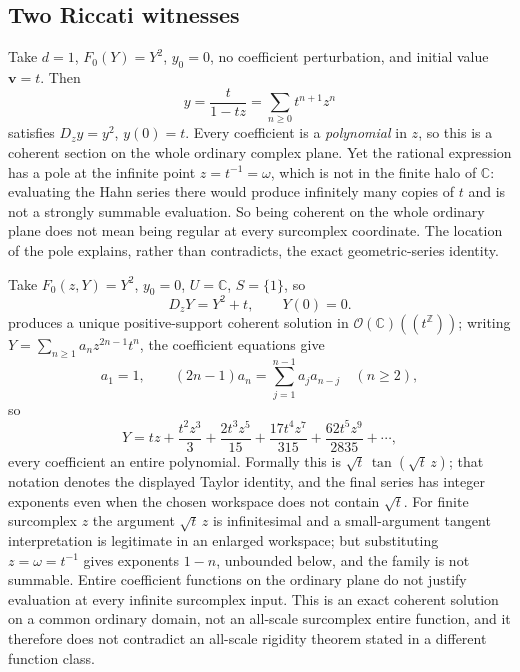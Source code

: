 \documentclass[11pt,letterpaper]{article}
\numberwithin{equation}{section}
\theoremstyle{definition}
\theoremstyle{remark}
\newcommand{\C}{\mathbb C}
\newcommand{\Z}{\mathbb Z}
\newcommand{\Hol}{\mathscr O}
\newcommand{\Dz}{D_{z}}
\begin{document}
\subsection{Two Riccati witnesses}
\label{diff:sub:riccati}

\begin{example}
\label{diff:ex:riccatipole}
Take $d=1$, $F_{0}(Y)=Y^{2}$, $y_{0}=0$, no coefficient perturbation, and
initial value $\mathbf{v}=t$. Then
\begin{equation}\label{diff:eq:riccatipole}
 y=\frac{t}{1-tz}=\sum_{n\geq0}t^{n+1}z^{n}
\end{equation}
satisfies $\Dz y=y^{2}$, $y(0)=t$. Every coefficient is a \emph{polynomial} in
$z$, so this is a coherent section on the whole ordinary complex plane. Yet
the rational expression has a pole at the infinite point $z=t^{-1}=\omega$,
which is not in the finite halo of $\C$: evaluating the Hahn series there
would produce infinitely many copies of $t$ and is not a strongly summable
evaluation. So being coherent on the whole ordinary plane does not mean being
regular at every surcomplex coordinate. The location of the pole explains,
rather than contradicts, the exact geometric-series identity.
\end{example}

\begin{example}
\label{diff:ex:riccatitan}
Take $F_{0}(z,Y)=Y^{2}$, $y_{0}=0$, $U=\C$, $S=\{1\}$, so
\begin{equation}\label{diff:eq:riccati}
 \Dz Y=Y^{2}+t,\qquad Y(0)=0 .
\end{equation}
 produces a unique positive-support coherent solution in
$\Hol(\C)((t^{\Z}))$; writing $Y=\sum_{n\geq1}a_{n}z^{2n-1}t^{n}$, the
coefficient equations give
\begin{equation}\label{diff:eq:riccatirecur}
 a_{1}=1,\qquad (2n-1)a_{n}=\sum_{j=1}^{n-1}a_{j}a_{n-j}\quad(n\geq2),
\end{equation}
so
\begin{equation}\label{diff:eq:riccatiexpand}
 Y=tz+\frac{t^{2}z^{3}}{3}+\frac{2t^{3}z^{5}}{15}
 +\frac{17t^{4}z^{7}}{315}+\frac{62t^{5}z^{9}}{2835}+\cdots,
\end{equation}
every coefficient an entire polynomial. Formally this is
$\sqrt t\,\tan(\sqrt t\,z)$; that notation denotes the displayed Taylor
identity, and the final series has integer exponents even when the chosen
workspace does not contain $\sqrt t$. For finite surcomplex $z$ the argument
$\sqrt t\,z$ is infinitesimal and a small-argument tangent interpretation is
legitimate in an enlarged workspace; but substituting $z=\omega=t^{-1}$ gives
exponents $1-n$, unbounded below, and the family is not summable. Entire
coefficient functions on the ordinary plane do not justify evaluation at every
infinite surcomplex input. This is an exact coherent solution on a common
ordinary domain, not an all-scale surcomplex entire function, and it therefore
does not contradict an all-scale rigidity theorem stated in a different
function class.
\end{example}
\end{document}

